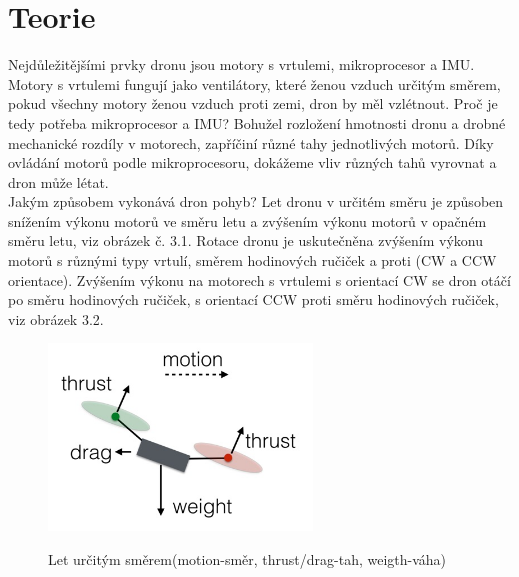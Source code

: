 \chapter{Teorie}
\label{2-teorie}

Nejdůležitějšími prvky dronu jsou motory s vrtulemi, mikroprocesor a IMU. Motory s vrtulemi fungují jako ventilátory, které ženou vzduch určitým směrem, pokud všechny motory ženou vzduch proti zemi, dron by měl vzlétnout. Proč je tedy potřeba mikroprocesor a IMU? Bohužel rozložení hmotnosti dronu a drobné mechanické rozdíly v motorech, zapříčiní různé tahy jednotlivých motorů. Díky ovládání motorů podle mikroprocesoru, dokážeme vliv různých tahů vyrovnat a dron může létat.\\
Jakým způsobem vykonává dron pohyb? Let dronu v určitém směru je způsoben snížením výkonu motorů ve směru letu a zvýšením výkonu motorů v opačném směru letu, viz obrázek č. 3.1. Rotace dronu je uskutečněna zvýšením výkonu motorů s různými typy vrtulí, směrem hodinových ručiček a proti (CW a CCW orientace). Zvýšením výkonu na motorech s vrtulemi s orientací CW se dron otáčí po směru hodinových ručiček, s orientací CCW proti směru hodinových ručiček, viz obrázek 3.2.\\

\begin{figure}[H]
	\centering
	\includegraphics[width=7cm]{pictures/dronfly.jpg}
	\caption{Let určitým směrem(motion-směr, thrust/drag-tah, weigth-váha)}
	\cite{physicdrone}
\end{figure}

